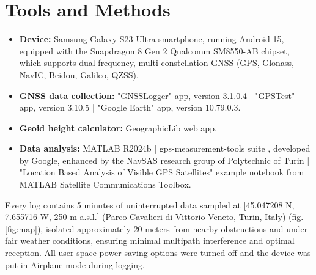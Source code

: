 \section{Tools and Methods}
\begin{itemize}
    \item \textbf{Device:} Samsung Galaxy S23 Ultra smartphone, running Android 15, equipped with the Snapdragon 8 Gen 2 Qualcomm SM8550-AB chipset, which supports dual-frequency, multi-constellation GNSS (GPS, Glonass, NavIC, Beidou, Galileo, QZSS). \cite{samsungs23ultra}
    \item \textbf{GNSS data collection:} "GNSSLogger" app, version 3.1.0.4 \cite{gnssLoggerApp} | "GPSTest" app, version 3.10.5 \cite{gpsTestApp} | "Google Earth" app, version 10.79.0.3. \cite{googleEarthApp}
    \item \textbf{Geoid height calculator:} GeographicLib web app. \cite{geoidHeightCalculator}
    \item \textbf{Data analysis:} MATLAB R2024b \cite{matlab} | gps-measurement-tools suite \cite{gpsMeasurementToolsCodebase}, developed by Google, enhanced by the NavSAS research group of Polytechnic of Turin \cite{navSAS} | "Location Based Analysis of Visible GPS Satellites" example notebook from MATLAB Satellite Communications Toolbox. \cite{skyplotsNotebook}
\end{itemize}
Every log contains 5 minutes of uninterrupted data sampled at [45.047208 N, 7.655716 W, 250 m a.s.l.] (Parco Cavalieri di Vittorio Veneto, Turin, Italy) (fig. \ref{fig:map}), isolated approximately 20 meters from nearby obstructions and under fair weather conditions, ensuring minimal multipath interference and optimal
reception. All user-space power-saving options were turned off and the device was put in Airplane mode during logging.
\label{sec:tools}
